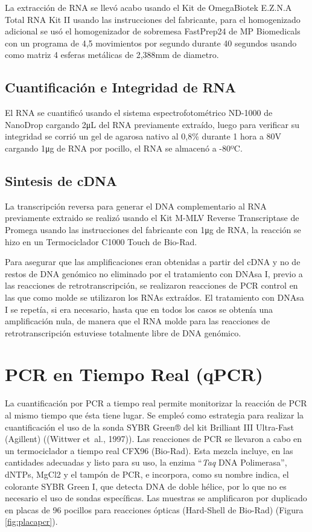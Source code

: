 \documentclass[12pt,letterpaper,oneside]{scrbook}
\begin{document}
La extracción de RNA se llevó acabo usando el Kit de OmegaBiotek E.Z.N.A
Total RNA Kit II usando las instrucciones del fabricante, para el
homogenizado adicional se usó el homogenizador de sobremesa FastPrep24
de MP Biomedicals con un programa de 4,5 movimientos por segundo durante
40 segundos usando como matriz 4 esferas metálicas de 2,388mm de
diametro.

\subsection{Cuantificación e Integridad de RNA}

El RNA se cuantificó usando el sistema espectrofotométrico ND-1000 de
NanoDrop cargando 2\si{\micro\liter} del RNA previamente extraído, luego
para verificar su integridad se corrió un gel de agarosa nativo al 0,8\%
durante 1 hora a 80V cargando 1\si{\micro\gram} de RNA por pocillo, el
RNA se almacenó a -80ºC.

\subsection{Sintesis de cDNA}

La transcripción reversa para generar el DNA complementario al RNA
previamente extraido se realizó usando el Kit M-MLV Reverse
Transcriptase de Promega usando las instrucciones del fabricante con
1\si{\micro\gram} de RNA, la reacción se hizo en un Termociclador C1000
Touch de Bio-Rad.

Para asegurar que las amplificaciones eran obtenidas a partir del cDNA y
no de restos de DNA genómico no eliminado por el tratamiento con DNAsa
I, previo a las reacciones de retrotranscripción, se realizaron
reacciones de PCR control en las que como molde se utilizaron los RNAs
extraídos. El tratamiento con DNAsa I se repetía, si era necesario,
hasta que en todos los casos se obtenía una amplificación nula, de
manera que el RNA molde para las reacciones de retrotranscripción
estuviese totalmente libre de DNA genómico.

\section{PCR en Tiempo Real (qPCR)}

La cuantificación por PCR a tiempo real permite monitorizar la reacción
de PCR al mismo tiempo que ésta tiene lugar. Se empleó como estrategia
para realizar la cuantificación el uso de la sonda SYBR Green® del kit
Brilliant III Ultra-Fast (Agillent) ((Wittwer et~al., 1997)). Las
reacciones de PCR se llevaron a cabo en un termociclador a tiempo real
CFX96 (Bio-Rad). Esta mezcla incluye, en las cantidades adecuadas y
listo para su uso, la enzima ``\emph{Taq} DNA Polimerasa'', dNTPs, MgCl2
y el tampón de PCR, e incorpora, como su nombre indica, el colorante
SYBR Green I, que detecta DNA de doble hélice, por lo que no es
necesario el uso de sondas específicas. Las muestras se amplificaron por
duplicado en placas de 96 pocillos para reacciones ópticas (Hard-Shell
de Bio-Rad) (Figura \ref{fig:placapcr}).
\end{document}
